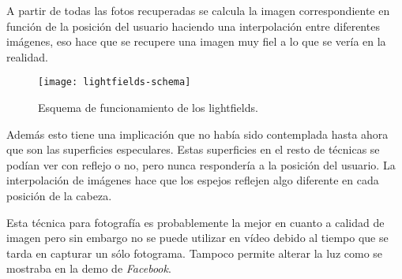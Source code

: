 
A partir de todas las fotos recuperadas se calcula la imagen correspondiente en función de la posición del usuario haciendo una interpolación entre diferentes imágenes, eso hace que se recupere una imagen muy fiel a lo que se vería en la realidad. 

\begin{figure}[h]
  \centering
	\texttt{[image: lightfields-schema]}
  \caption{Esquema de funcionamiento de los lightfields.}
  \label{fig:lightfields-schema}
\end{figure}

Además esto tiene una implicación que no había sido contemplada hasta ahora que son las superficies especulares. Estas superficies en el resto de técnicas se podían ver con reflejo o no, pero nunca respondería a la posición del usuario. La interpolación de imágenes hace que los espejos reflejen algo diferente en cada posición de la cabeza.

Esta técnica para fotografía es probablemente la mejor en cuanto a calidad de imagen pero sin embargo no se puede utilizar en vídeo debido al tiempo que se tarda en capturar un sólo fotograma. Tampoco permite alterar la luz como se mostraba en la demo de \textit{Facebook}.











